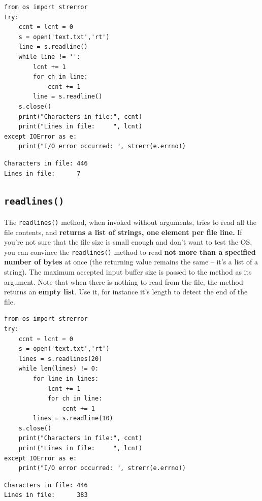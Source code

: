 \documentclass[11pt]{article}
\begin{document}
\begin{verbatim}
from os import strerror
try:
	ccnt = lcnt = 0
	s = open('text.txt','rt')
	line = s.readline()
	while line != '':
		lcnt += 1
		for ch in line:
			ccnt += 1
		line = s.readline()
	s.close()
	print("Characters in file:", ccnt)
	print("Lines in file:     ", lcnt)
except IOError as e:
	print("I/O error occurred: ", strerr(e.errno))
\end{verbatim}

\begin{verbatim}
Characters in file: 446
Lines in file:      7
\end{verbatim}

\subsection{\texttt{readlines()}}
\label{sec:orgbfcdbb8}
The \texttt{readlines()} method, when invoked without arguments, tries to
read all the file contents, and \textbf{returns a list of strings, one}
\textbf{element per file line.} If you’re not sure that the file size is
small enough and don’t want to test the OS, you can convince the
\texttt{readlines()} method to read \textbf{not more than a specified number of
bytes} at once (the returning value remains the same – it’s a list of
a string).  The maximum accepted input buffer size is passed to the
method as its argument. Note that when there is nothing to read from
the file, the method returns an \textbf{empty list}. Use it, for instance
it's length to detect the end of the file.


\begin{verbatim}
from os import strerror
try:
	ccnt = lcnt = 0
	s = open('text.txt','rt')
	lines = s.readlines(20)
	while len(lines) != 0:
		for line in lines:
			lcnt += 1
			for ch in line:
				ccnt += 1
		lines = s.readline(10)
	s.close()
	print("Characters in file:", ccnt)
	print("Lines in file:     ", lcnt)
except IOError as e:
	print("I/O error occurred: ", strerr(e.errno))
\end{verbatim}

\begin{verbatim}
Characters in file: 446
Lines in file:      383
\end{verbatim}

\vspace{10 mm}
\end{document}

